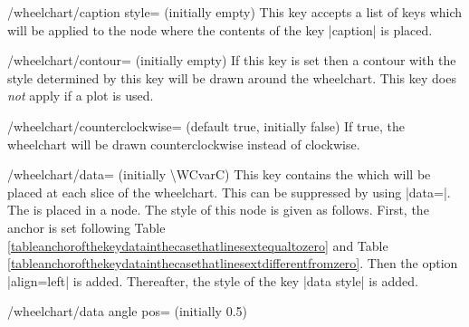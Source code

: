 \documentclass[a4paper,english,dvipsnames]{ltxdoc}
\begin{document}
\begin{stylekey}{/wheelchart/caption style= (initially \normalfont empty)}
This key accepts a list of keys which will be applied to the node where the contents of the key |caption| is placed.
\begin{codeexample}[width=10cm]
\end{codeexample}
\end{stylekey}
\begin{stylekey}{/wheelchart/contour= (initially \normalfont empty)}
If this key is set then a contour with the style determined by this key will be drawn around the wheelchart. This key does \emph{not} apply if a plot is used.
\end{stylekey}
\begin{key}{/wheelchart/counterclockwise= (default true, initially false)}
If true, the wheelchart will be drawn counterclockwise instead of clockwise.
\end{key}
\begin{key}{/wheelchart/data= (initially \textbackslash WCvarC)}
This key contains the  which will be placed at each slice of the wheelchart. This can be suppressed by using |data={}|. The  is placed in a node. The style of this node is given as follows. First, the anchor is set following Table \ref{tableanchorofthekeydatainthecasethatlinesextequaltozero} and Table \ref{tableanchorofthekeydatainthecasethatlinesextdifferentfromzero}. Then the option |align=left| is added. Thereafter, the style of the key |data style| is added.
\end{key}
\begin{key}{/wheelchart/data angle pos= (initially 0.5)}
\end{key}
\end{document}
